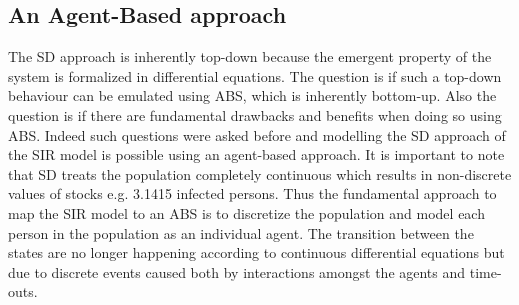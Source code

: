 \subsection*{An Agent-Based approach}
The SD approach is inherently top-down because the emergent property of the system is formalized in differential equations. The question is if such a top-down behaviour can be emulated using ABS, which is inherently bottom-up. Also the question is if there are fundamental drawbacks and benefits when doing so using ABS. Indeed such questions were asked before and modelling the SD approach of the SIR model is possible using an agent-based approach. It is important to note that SD treats the population completely continuous which results in non-discrete values of stocks e.g. 3.1415 infected persons. Thus the fundamental approach to map the SIR model to an ABS is to discretize the population and model each person in the population as an individual agent. The transition  between the states are no longer happening according to continuous differential equations but due to discrete events caused both by interactions amongst the agents and time-outs.

